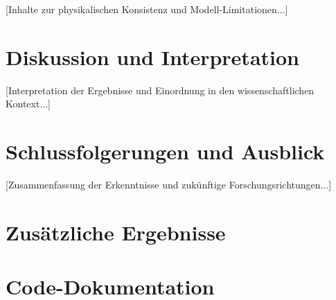 \documentclass[12pt,twoside,openright]{scrreprt}
\theoremstyle{definition}
\theoremstyle{plain}
\begin{document}
	[Inhalte zur physikalischen Konsistenz und Modell-Limitationen...]
	
	\chapter{Diskussion und Interpretation}
	\label{ch:discussion}
	
	[Interpretation der Ergebnisse und Einordnung in den wissenschaftlichen Kontext...]
	
	\chapter{Schlussfolgerungen und Ausblick}
	\label{ch:conclusions}
	
	[Zusammenfassung der Erkenntnisse und zukünftige Forschungsrichtungen...]
	
	\appendix
	\chapter{Zusätzliche Ergebnisse}
	\label{app:additional}
	
	\chapter{Code-Dokumentation}
	\label{app:code}
	
	\printbibliography
	
\end{document}

